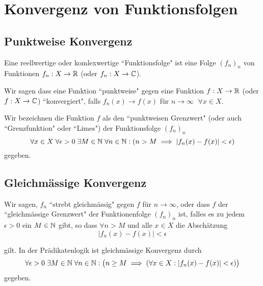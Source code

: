 \section{Konvergenz von Funktionsfolgen}
\subsection{Punktweise Konvergenz}
\begin{mydef}
	Eine reellwertige oder komlexwertige ``Funktionsfolge" ist eine Folge $(f_n)_n$ von Funktionen $f_n: X \to \mathbb{R}$ (oder $f_n: X \to \mathbb{C}$). 
	
	Wir sagen dass eine Funktion ``punktweise" gegen eine Funktion $f: X \to \mathbb{R}$ (oder $f: X \to \mathbb{C}$) ``konvergiert", falls $f_n(x) \to f(x)$ für $n \to \infty$ $\; \forall x\in X$.
	
	Wir bezeichnen die Funktion $f$ als den ``punktweisen Grenzwert" (oder auch ``Grenzfunktion" oder ``Limes") der Funktionsfolge $(f_n)_n$
	\begin{equation}
		\forall x \in X \; \forall \epsilon > 0 \; \exists M \in \mathbb{N} \; \forall n \in \mathbb{N} : (n > M \implies |f_n(x)-f(x)| < \epsilon) 
	\end{equation}
	gegeben.

\end{mydef}

\subsection{Gleichmässige Konvergenz}

\begin{mydef}
	Wir sagen, $f_n$ ``strebt gleichmässig" gegen $f$ für $n \to \infty$, oder dass $f$ der ``gleichmässige Grenzwert" der Funktionenfolge $(f_n)_n$ ist, falles es zu jedem $\epsilon > 0$ ein $M \in \mathbb{N}$ gibt, so dass $\forall n > M$ und alle $x\in X$ die Abschätzung
	\begin{equation}
		|f_n(x)-f(x)|<\epsilon
	\end{equation}
	
	gilt. In der Prädikatenlogik ist gleichmässige Konvergenz durch
	\begin{equation}
	  \forall \epsilon > 0 \; \exists M \in \mathbb{N} \; \forall n\in \mathbb{N} : \big(n\geq M \implies ( \forall x \in X: |f_n(x) - f(x)| < \epsilon ) \big)
	\end{equation}
	gegeben.
	
\end{mydef}

